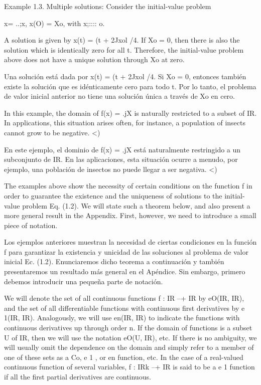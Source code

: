\documentclass[]{article}
\begin{document}
Example 1.3. Multiple solutions: Consider the initial-value problem

x= ..;x, x(O) = Xo, with x;:::: o.

A solution is given by x(t) = (t + 2Jxol /4. If Xo = 0, then there is also the solution which is identically zero for all t. Therefore, the initial-value problem above does not have a unique solution through Xo at zero.

Una solución está dada por x(t) = (t + 2Jxol /4. Si Xo = 0, entonces también existe la solución que es idénticamente cero para todo t. Por lo tanto, el problema de valor inicial anterior no tiene una solución única a través de Xo en cero.

In this example, the domain of f(x) = .jX is naturally restricted to a subset of IR. In applications, this situation arises often, for instance, a population of insects cannot grow to be negative. <)

En este ejemplo, el dominio de f(x) = .jX está naturalmente restringido a un subconjunto de IR. En las aplicaciones, esta situación ocurre a menudo, por ejemplo, una población de insectos no puede llegar a ser negativa. <)

The examples above show the necessity of certain conditions on the function f in order to guarantee the existence and the uniqueness of solutions to the initial-value problem Eq. (1.2). We will state such a theorem below, and also present a more general result in the Appendix. First, however, we need to introduce a small piece of notation.

Los ejemplos anteriores muestran la necesidad de ciertas condiciones en la función f para garantizar la existencia y unicidad de las soluciones al problema de valor inicial Ec. (1.2). Enunciaremos dicho teorema a continuación y también presentaremos un resultado más general en el Apéndice. Sin embargo, primero debemos introducir una pequeña parte de notación.

We will denote the set of all continuous functions f : IR --+ IR by eO(IR, IR), and the set of all differentiable functions with continuous first derivatives by e 1(IR, IR). Analogously, we will use en(IR, IR) to indicate the functions with continuous derivatives up through order n. If the domain of functions is a subset U of IR, then we will use the notation eO(U, IR), etc. If there is no ambiguity, we will usually omit the dependence on the domain and simply refer to a member of one of these sets as a Co, e 1 , or en function, etc. In the case of a real-valued continuous function of several variables, f : IRk --+ IR is said to be a e 1 function if all the first partial derivatives are continuous.
\end{document}
